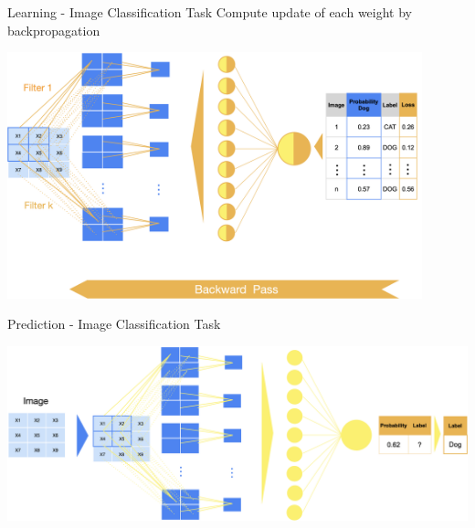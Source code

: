 \documentclass[11pt,compress,t,notes=noshow, xcolor=table]{beamer}
\begin{document}
\begin{vbframe}{Learning - Image Classification Task}
\small Compute update of each weight by backpropagation
\vspace{0.5cm}
\begin{center}
   \includegraphics[width = 0.9\textwidth]{slides/neural-networks/figure_man/nutshell-nn-learning-backpropagation.png}    
\end{center}    
\end{vbframe}



\begin{vbframe}{Prediction - Image Classification Task}
\vspace{0.5cm}
\begin{center}
   \includegraphics[width = \textwidth]{slides/neural-networks/figure_man/nutshell-nn-prediction.png}    
\end{center}

\end{vbframe}
\end{document}
